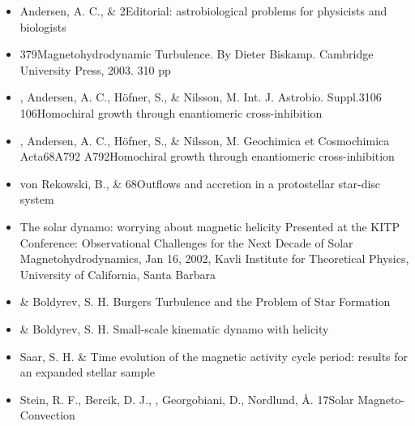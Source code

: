 \begin{itemize}
\item[15.]
Andersen, A. C., \& \Brandenburg{}
{2}{Editorial: astrobiological problems for physicists and biologists}

\item[14.]
\Brandenburg{}
{379}{Magnetohydrodynamic Turbulence. By Dieter Biskamp. Cambridge
University Press, 2003. 310 pp}

\item[13.]
\Brandenburg, Andersen, A. C., H\"ofner, S., \& Nilsson, M.
{Int. J. Astrobio. Suppl.}{3}{106}
{106}{Homochiral growth through enantiomeric cross-inhibition}

\item[12.]
\Brandenburg, Andersen, A. C., H\"ofner, S., \& Nilsson, M.
{Geochimica et Cosmochimica Acta}{68}{A792}
{A792}{Homochiral growth through enantiomeric cross-inhibition}

\item[11.]
von Rekowski, B., \& \Brandenburg{}
{68}{Outflows and accretion in a protostellar star-disc system}

\item[10.]
\Brandenburg{}
{The solar dynamo: worrying about magnetic helicity}
{Presented at the KITP Conference: Observational Challenges for the Next
Decade of Solar Magnetohydrodynamics, Jan 16, 2002, Kavli Institute for
Theoretical Physics, University of California, Santa Barbara}

\item[9.]
\Brandenburg \& Boldyrev, S. H.
{Burgers Turbulence and the Problem of Star Formation}

\item[8.]
\Brandenburg \& Boldyrev, S. H.
{Small-scale kinematic dynamo with helicity}

\item[7.]
Saar, S. H. \& \Brandenburg{}
{Time evolution of the magnetic activity cycle period:
results for an expanded stellar sample}

\item[6.]
Stein, R. F., Bercik, D. J., \Brandenburg, Georgobiani, D.,
Nordlund, \AA.
{17}{Solar Magneto-Convection}


\end{itemize}
